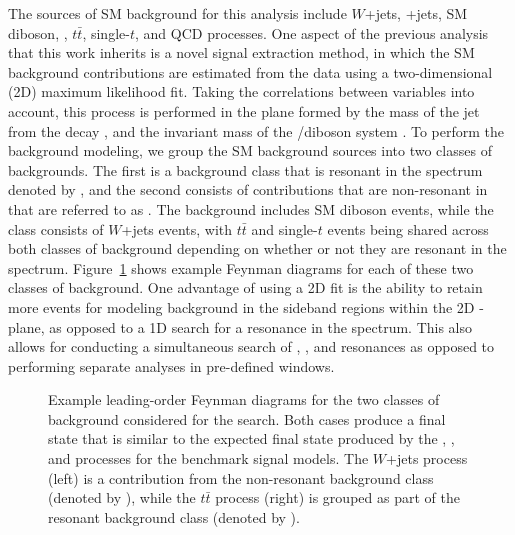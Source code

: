 The sources of SM background for this analysis include $W$+jets, \DY+jets, SM diboson, \bbbar, $t\bar{t}$, single-$t$, and QCD processes.
One aspect of the previous analysis that this work inherits is a novel signal extraction method, in which the SM background contributions are estimated from the data using a two-dimensional (2D) maximum likelihood fit.
Taking the correlations between variables into account, this process is performed in the plane formed by the mass of the jet from the \VorH decay \MJ, and the invariant mass of the \WV/\WH diboson system \MVV.
To perform the background modeling, we group the SM background sources into two classes of backgrounds.
The first is a background class that is resonant in the \MJ spectrum denoted by \WVt, and the second consists of contributions that are non-resonant in \MJ that are referred to as \Wjets.
The \WVt background includes SM diboson events, while the \Wjets class consists of $W$+jets events, with $t\bar{t}$ and single-$t$ events being shared across both classes of background depending on whether or not they are resonant in the \MJ spectrum.
Figure~\ref{fig:bkgFeynman} shows example Feynman diagrams for each of these two classes of background.
One advantage of using a 2D fit is the ability to retain more events for modeling background in the sideband regions within the 2D \MJ-\MVV plane, as opposed to a 1D search for a resonance in the \MVV spectrum.
This also allows for conducting a simultaneous search of \WW, \WZ, and \WH resonances as opposed to performing separate analyses in pre-defined \MJ windows.

\begin{figure}[htbp]
  \centering
  
  \caption{
    Example leading-order Feynman diagrams for the two classes of background considered for the search.
    Both cases produce a final state that is similar to the expected final state produced by the \ggF, \DY, and \VBF processes for the benchmark signal models.
    The $W$+jets process (left) is a contribution from the non-resonant background class (denoted by \Wjets), while the $t\bar{t}$ process (right) is grouped as part of the resonant background class (denoted by \WVt).
  }
  \label{fig:bkgFeynman}
\end{figure}

